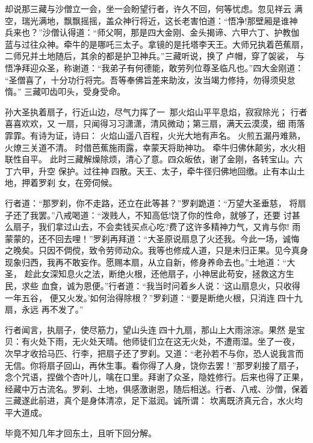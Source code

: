 却说那三藏与沙僧立一会，坐一会盼望行者，许久不回，何等忧虑。忽见祥云
满空，瑞光满地，飘飘摇摇，盖众神行将近，这长老害怕道：“悟净!那壁厢是谁神
兵来也？”沙僧认得道：“师父啊，那是四大金刚、金头揭谛、六甲六丁、护教伽
蓝与过往众神。牵牛的是哪吒三太子。拿镜的是托塔李天王。大师兄执着芭蕉扇，
二师兄并土地随后，其余的都是护卫神兵。”三藏听说，换了卢帽，穿了袈裟，
与悟净拜迎众圣，称谢道：“我弟子有何德能，敢劳列位尊圣临凡也。”四大金刚道：
“圣僧喜了，十分功行将完。吾等奉佛旨差来助汝，汝当竭力修持，勿得须臾怠惰。”
三藏叩齿叩头，受身受命。

孙大圣执着扇子，行近山边，尽气力挥了一，那火焰山平平息焰，寂寂除光；
行者喜喜欢欢，又一扇，只闻得习习潇潇，清风微动；第三扇，满天云漠漠，细
雨落霏霏。有诗为证，诗曰：
火焰山遥八百程，火光大地有声名。
火煎五漏丹难熟，火燎三关道不清。
时借芭蕉施雨露，幸蒙天将助神功。
牵牛归佛休颠劣，水火相联性自平。
此时三藏解燥除烦，清心了意。四众皈依，谢了金刚，各转宝山。六丁六甲，升空
保护。过往神四散。天王、太子，牵牛径归佛地回缴。止有本山土地，押着罗刹
女，在旁伺候。

行者道：“那罗刹，你不走路，还立在此等甚？”罗刹跪道：“万望大圣垂慈，
将扇子还了我罢。”八戒喝道：“泼贱人，不知高低!饶了你的性命，就够了，还要
讨甚么扇子，我们拿过山去，不会卖钱买点心吃?费了这许多精神力气，又肯与你!
雨蒙蒙的，还不回去哩！”罗刹再拜道：“大圣原说扇息了火还我。今此一场，诚悔
之晚矣。只因不倜傥，致令劳师动众。我等也修成人道，只是未归正果。见今真身
现象归西，我再不敢妄作。愿赐本扇，从立自新，修身养命去也。”土地道：“大圣，
趁此女深知息火之法，断绝火根，还他扇子，小神居此苟安，拯救这方生民，求些
血食，诚为恩便。”行者道：“我当时问着乡人说：‘这山扇息火，只收得一年五谷，
便又火发。’如何治得除根？”罗刹道：“要是断绝火根，只消连四十九扇，永远
再不发了。”

行者闻言，执扇子，使尽筋力，望山头连四十九扇，那山上大雨淙淙。果然
是宝贝：有火处下雨，无火处天晴。他师徒们立在这无火处，不遭雨湿。坐了一夜，
次早才收拾马匹、行李，把扇子还了罗刹。又道：“老孙若不与你，恐人说我言而
无信。你将扇子回山，再休生事。看你得了人身，饶你去罢！”那罗刹接了扇子，
念个咒语，捏做个杏叶儿，噙在口里。拜谢了众圣，隐姓修行。后来也得了正果，
经藏中万古流名。罗刹、土地，俱感激谢恩，随后相送。行者、八戒、沙僧，保着
三藏遂此前进，真个是身体清凉，足下滋润。诚所谓：
坎离既济真元合，水火均平大道成。

毕竟不知几年才回东土，且听下回分解。